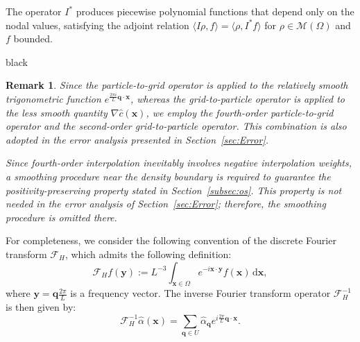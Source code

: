 \documentclass[review,onefignum,onetabnum]{siamart250211}
\newtheorem{remark}[theorem]{Remark}
\begin{document}
The operator \(I^*\) produces piecewise polynomial functions that depend only on the nodal values, satisfying the adjoint relation \( \langle I\rho, f\rangle = \langle \rho, I^*f\rangle \) for \(\rho \in \mathcal{M}(\Omega)\) and \(f\) bounded.
\begin{color}{black}
\begin{remark}
\label{remark:smoothness}
Since the particle-to-grid operator is applied to the relatively smooth trigonometric function
\(e^{\frac{2\pi i}{L}\mathbf{q}\cdot\mathbf{x}}\),
whereas the grid-to-particle operator is applied to the less smooth quantity $\nabla \hat{c}(\mathbf{x})$, we employ the fourth-order particle-to-grid operator and the second-order grid-to-particle operator. This combination is also adopted in the error analysis presented in Section~\ref{sec:Error}.

Since fourth-order interpolation inevitably involves negative interpolation weights, a smoothing procedure near the density boundary \cite{doi:10.1137/16M105962X,NATARAJAN2021114001} is required to guarantee the positivity-preserving property stated in Section~\ref{subsec:os}. This property is not needed in the error analysis of Section~\ref{sec:Error}; therefore, the smoothing procedure is omitted there.    
\end{remark}
\end{color}

For completeness, we consider the following convention of the discrete Fourier transform
\(\mathcal{F}_H\), which admits the following definition:
\begin{equation}
\mathcal{F}_H f\left(\mathbf{y}\right) := L^{-3} \int_{\mathbf{x} \in \Omega} e^{-i \mathbf{x} \cdot \mathbf{y}} f(\mathbf{x}) \, \mathrm{d}\mathbf{x},
\end{equation}
where \(\mathbf{y} = \mathbf{q} \frac{2\pi}{L}\) is a frequency vector.
The inverse Fourier transform operator \(\mathcal{F}_H^{-1}\) is then given by:
\begin{equation}
\mathcal{F}_H^{-1} \hat{\alpha}(\mathbf{x}) = \sum_{\mathbf{q} \in U} \hat{\alpha}_{\mathbf{q}} e^{i \frac{2\pi}{L} \mathbf{q} \cdot \mathbf{x}}.
\end{equation}
\end{document}
